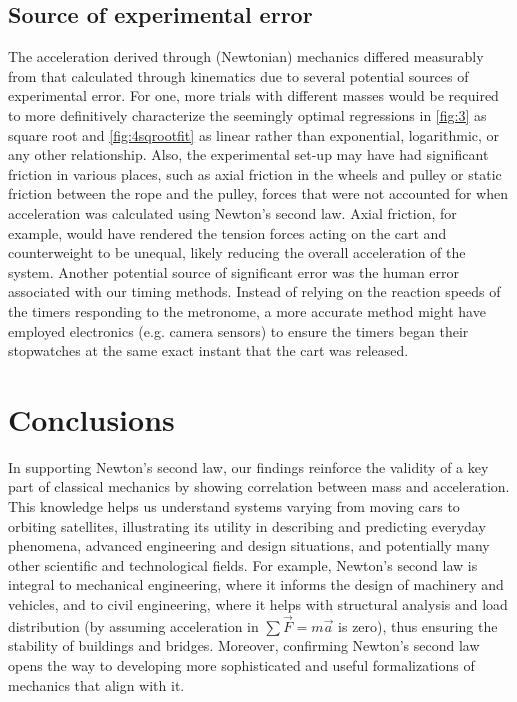 \documentclass[reprint,amsmath,amssymb,aps]{revtex4-2}
\begin{document}
\subsection{Source of experimental error}
The acceleration derived through (Newtonian) mechanics differed measurably from that calculated through kinematics due to several potential sources of experimental error. For one, more trials with different masses would be required to more definitively characterize the seemingly optimal regressions in \cref{fig:3} as square root and \cref{fig:4sqrootfit} as linear rather than exponential, logarithmic, or any other relationship. Also, the experimental set-up may have had significant friction in various places, such as axial friction in the wheels and pulley or static friction between the rope and the pulley, forces that were not accounted for when acceleration was calculated using Newton's second law. Axial friction, for example, would have rendered the tension forces acting on the cart and counterweight to be unequal, likely reducing the overall acceleration of the system. Another potential source of significant error was the human error associated with our timing methods. Instead of relying on the reaction speeds of the timers responding to the metronome, a more accurate method might have employed electronics (e.g. camera sensors) to ensure the timers began their stopwatches at the same exact instant that the cart was released.


\section{Conclusions}
In supporting Newton's second law, our findings reinforce the validity of a key part of classical mechanics by showing correlation between mass and acceleration. This knowledge helps us understand systems varying from moving cars to orbiting satellites, illustrating its utility in describing and predicting everyday phenomena, advanced engineering and design situations, and potentially many other scientific and technological fields. For example, Newton's second law is integral to mechanical engineering, where it informs the design of machinery and vehicles, and to civil engineering, where it helps with structural analysis and load distribution (by assuming acceleration in $\sum \vec{F}=m\vec{a}$ is zero), thus ensuring the stability of buildings and bridges. Moreover, confirming Newton's second law opens the way to developing more sophisticated and useful formalizations of mechanics that align with it.
\end{document}
